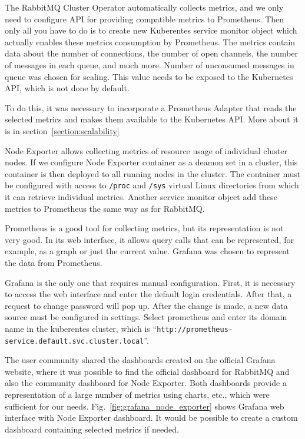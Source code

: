 The RabbitMQ Cluster Operator automatically collects metrics, and we only need to configure API for providing compatible metrics to Prometheus. Then only all you have to do is to create new Kuberentes service monitor object which actually enables these metrics consumption by Prometheus. The metrics contain data about the number of connections, the number of open channels, the number of messages in each queue, and much more. Number of unconsumed messages in queue was chosen for scaling. This value needs to be exposed to the Kubernetes API, which is not done by default.

To do this, it was necessary to incorporate a Prometheus Adapter that reads the selected metrics and makes them available to the Kubernetes API. More about it is in section~\ref{section:scalability} 

Node Exporter allows collecting metrics of resource usage of individual cluster nodes. If we configure Node Exporter container as a deamon set in a cluster, this container is then deployed to all running nodes in the cluster. The container must be configured with access to \texttt{/proc} and \texttt{/sys} virtual Linux directories from which it can retrieve individual metrics. Another service monitor object add these metrics to Prometheus the same way as for RabbitMQ.~\cite{NodeExporterSetup}

Prometheus is a good tool for collecting metrics, but its representation is not very good. In its web interface, it allows query calls that can be represented, for example, as a graph or just the current value. Grafana was chosen to represent the data from Prometheus. 

Grafana is the only one that requires manual configuration. First, it is necessary to access the web interface and enter the default login credentials. After that, a request to change password will pop up. After the change is made, a new data source must be configured in settings. Select prometheus and enter its domain name in the kuberentes cluster, which is “\texttt{http://prometheus-service.default.svc.cluster.local}”.

The user community shared the dashboards created on the official Grafana website, where it was possible to find the official dashboard for RabbitMQ and also the community dashboard for Node Exporter. Both dashboards provide a representation of a large number of metrics using charts, etc., which were sufficient for our needs. Fig.~\ref{fig:grafana_node_exporter} shows Grafana web interface with Node Exporter dashboard. It would be possible to create a custom dashboard containing selected metrics if needed.

